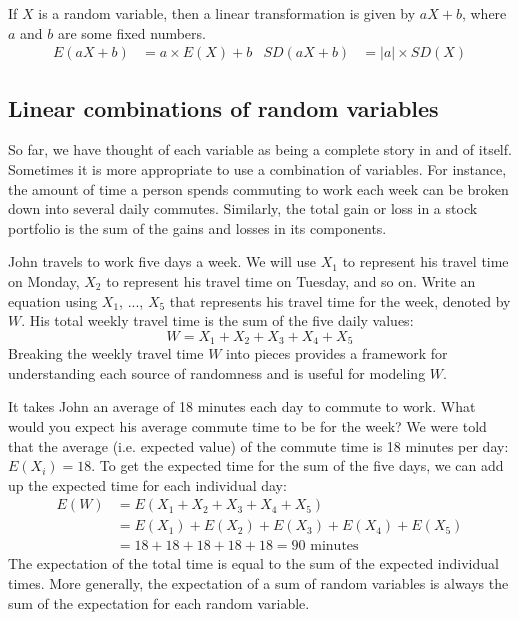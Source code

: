 \begin{termBox}{
If $X$ is a random variable, then a linear transformation is given by $aX + b$, where $a$ and $b$ are some fixed numbers.
\begin{align*}
E(aX+b) &= a\times E(X) + b
&
SD(aX+b) &= \lvert a\rvert \times SD(X)
\end{align*}
}
\end{termBox}

\subsection{Linear combinations of random variables}

So far, we have thought of each variable as being a complete story in and of itself. Sometimes it is more appropriate to use a combination of variables. For instance, the amount of time a person spends commuting to work each week can be broken down into several daily commutes. Similarly, the total gain or loss in a stock portfolio is the sum of the gains and losses in its components.

\begin{example}{John travels to work five days a week. We will use $X_1$ to represent his travel time on Monday, $X_2$ to represent his travel time on Tuesday, and so on. Write an equation using $X_1$, ..., $X_5$ that represents his travel time for the week, denoted by $W$.}
His total weekly travel time is the sum of the five daily values:
$$ W = X_1 + X_2 + X_3 + X_4 + X_5 $$
Breaking the weekly travel time $W$ into pieces provides a framework for understanding each source of randomness and is useful for modeling $W$.
\end{example}

\begin{example}{It takes John an average of 18 minutes each day to commute to work. What would you expect his average commute time to be for the week?}
We were told that the average (i.e. expected value) of the commute time is 18 minutes per day: $E(X_i) = 18$. To get the expected time for the sum of the five days, we can add up the expected time for each individual day:
\begin{align*}
E(W) &= E(X_1 + X_2 + X_3 + X_4 + X_5) \\
	&= E(X_1) + E(X_2) + E(X_3) + E(X_4) + E(X_5) \\
	&= 18 + 18 + 18 + 18 + 18 = 90\text{ minutes}
\end{align*}
The expectation of the total time is equal to the sum of the expected individual times. More generally, the expectation of a sum of random variables is always the sum of the expectation for each random variable.
\end{example}

